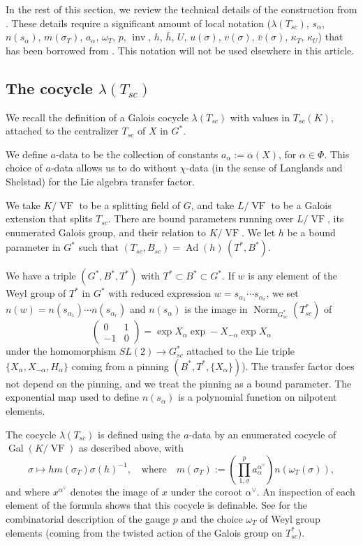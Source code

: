 \documentclass[12pt]{amsart}
\newcommand{\op}[1]{\operatorname{#1}}
\def\VF{{\op{VF}}}
\theoremstyle{plain}
\theoremstyle{definition}
\begin{document}
In the rest of this section, we review the technical details of the
construction from \cite{LSxf}.  These details require a significant
amount of local notation ($\lambda(T_{sc})$, $s_\alpha$, $n(s_\alpha)$,
$m(\sigma_T)$, $a_\alpha$, $\omega_T$, $p$, $\op{inv}$, $h$, $\bar h$,
$U$, $u(\sigma)$, $v(\sigma)$, $\bar v(\sigma)$, $\kappa_T$,
$\kappa_U$) that has been borrowed from \cite{LSxf}.  This notation
will not be used elsewhere in this article.




\subsection{The cocycle $\lambda(T_{sc})$}

We recall the definition of a Galois cocycle $\lambda(T_{sc})$ with
values in $T_{sc}(K)$, attached to the centralizer $T_{sc}$ of $X$ in
$G^*$.  

We define $a$-data to be the collection of constants $a_\alpha:=
\alpha(X)$, for $\alpha\in \Phi$.  This choice of $a$-data allows us
to do without $\chi$-data (in the sense of Langlands and Shelstad) for
the Lie algebra transfer factor.

We take $K/\VF$ to be a splitting field of $G$, and take
$L/\VF$ to be a Galois extension that splits $T_{sc}$.  There are
bound parameters running over $L/\VF$, its enumerated Galois group,
and their relation to $K/\VF$.  We let $h$ be a bound parameter in
$G^*$ such that $(T_{sc},B_{sc}) = \op{Ad}(h)\,(T^*,B^*)$.

We have a triple $(G^*,B^*,T^*)$ with $T^*\subset B^*\subset G^*$.  If
$w$ is any element of the Weyl group of $T^*$ in $G^*$ with reduced
expression $w = s_{\alpha_1}\cdots s_{\alpha_r}$, we set $n(w) =
n(s_{\alpha_1})\cdots n(s_{\alpha_r})$ and $n(s_\alpha)$ is the image
in $\op{Norm}_{G_{sc}^*}(T_{sc}^*)$ of
\[
\begin{pmatrix}0 &1\\ -1 & 0\end{pmatrix} = \op{exp} X_\alpha \op{exp} -
  X_{-\alpha} \op{exp} X_\alpha
\]
under the homomorphism $SL(2)\to G^*_{sc}$ attached to the Lie triple
$\{X_\alpha,X_{-\alpha},H_\alpha\}$ coming from a pinning
$(B^*,T^*,\{X_\alpha\})$).  The transfer factor does not depend on the
pinning, and we treat the pinning as a bound parameter.  The
exponential map used to define $n(s_\alpha)$ is a polynomial function
on nilpotent elements.

The cocycle $\lambda(T_{sc})$ is defined using the $a$-data by an enumerated
cocycle of $\op{Gal}(K/\VF)$ as described above, with
\[
\sigma \mapsto h m(\sigma_T) \sigma(h)^{-1},\quad \text{where}\quad
m(\sigma_T):= \left( \prod_{1,\sigma}^p 
a_\alpha^{\alpha^\vee}\right) n(\omega_T(\sigma)),
\]
and where $x^{\alpha^\vee}$ denotes the image of $x$ under the coroot
$\alpha^\vee$.  An inspection of each element of the formula shows
that this cocycle is definable.  See \cite{LSxf} for the combinatorial
description of the gauge $p$ and the choice $\omega_T$ of Weyl group
elements (coming from the twisted action of the Galois group on
$T^*_{sc}$).
\end{document}
